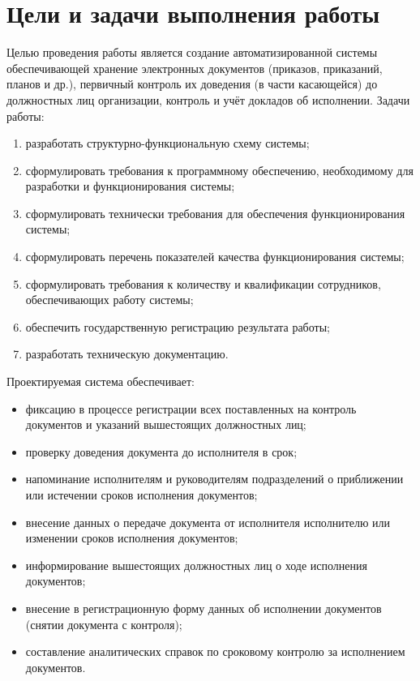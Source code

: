 \documentclass[russian]{eskdtext}
\begin{document}
\section{Цели и задачи выполнения работы}
Целью проведения работы является создание автоматизированной системы обеспечивающей хранение электронных документов (приказов, приказаний, планов и др.), первичный контроль их доведения (в части касающейся) до должностных лиц организации, контроль и учёт докладов об исполнении.
Задачи работы:
\begin{enumerate}
	\item разработать структурно-функциональную схему системы;
	\item сформулировать требования к программному обеспечению, необходимому для разработки и функционирования системы;
	\item сформулировать технически требования для обеспечения функционирования системы;
	\item сформулировать перечень показателей качества функционирования системы;
	\item сформулировать требования к количеству и квалификации сотрудников, обеспечивающих работу системы;
	\item обеспечить государственную регистрацию результата работы;
	\item разработать техническую документацию.	
\end{enumerate}


Проектируемая система обеспечивает:
\begin{itemize}
	\item фиксацию в процессе регистрации всех поставленных на контроль документов и указаний вышестоящих должностных лиц;
	\item проверку доведения документа до исполнителя в срок;
	\item напоминание исполнителям и руководителям подразделений о приближении или истечении сроков исполнения документов;
	\item внесение данных о передаче документа от исполнителя исполнителю или изменении сроков исполнения документов;
	\item информирование вышестоящих должностных лиц о ходе исполнения документов;
	\item внесение в регистрационную форму данных об исполнении документов (снятии документа с контроля);
	\item составление аналитических справок по сроковому контролю за исполнением документов.
\end{itemize}
\end{document}
